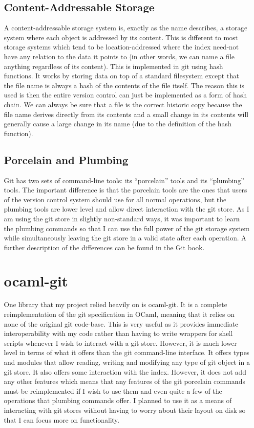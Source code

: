 \subsection{Content-Addressable Storage}

A content-addressable storage system is, exactly as the name describes, a storage system where each object is addressed by its content. This is different to most storage systems which tend to be location-addressed where the index need-not have any relation to the data it points to (in other words, we can name a file anything regardless of its content). This is implemented in git using hash functions. It works by storing data on top of a standard filesystem except that the file name is always a hash of the contents of the file itself. The reason this is used is then the entire version control can just be implemented as a form of hash chain. We can always be sure that a file is the correct historic copy because the file name derives directly from its contents and a small change in its contents will generally cause a large change in its name (due to the definition of the hash function). 

\subsection{Porcelain and Plumbing}

Git has two sets of command-line tools: its ``porcelain'' tools and its ``plumbing'' tools. The important difference is that the porcelain tools are the ones that users of the version control system should use for all normal operations, but the plumbing tools are lower level and allow direct interaction with the git store. As I am using the git store in slightly non-standard ways, it was important to learn the plumbing commands so that I can use the full power of the git storage system while simultaneously leaving the git store in a valid state after each operation. A further description of the differences can be found in the Git book\cite{chacon2014git}.

\section{ocaml-git}

One library that my project relied heavily on is ocaml-git\cite{code_ocaml-git}. It is a complete reimplementation of the git specification in OCaml, meaning that it relies on none of the original git code-base. This is very useful as it provides immediate interoperability with my code rather than having to write wrappers for shell scripts whenever I wish to interact with a git store. However, it is much lower level in terms of what it offers than the git command-line interface. It offers types and modules that allow reading, writing and modifying any type of git object in a git store. It also offers some interaction with the index. However, it does not add any other features which means that any features of the git porcelain commands must be reimplemented if I wish to use them and even quite a few of the operations that plumbing commands offer. I planned to use it as a means of interacting with git stores without having to worry about their layout on disk so that I can focus more on functionality.

